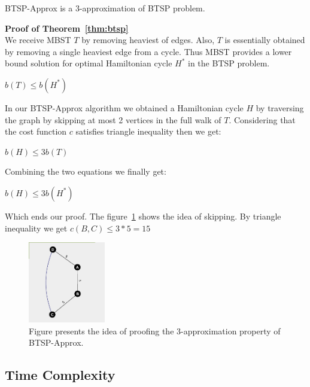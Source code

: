 \documentclass[runningheads, a4paper]{llncs}
\begin{document}
\begin{theorem} \label{thm:btsp}
    BTSP-Approx is a 3-approximation of BTSP problem.
\end{theorem}

\textbf {Proof of Theorem~\ref{thm:btsp}}\\
        
We receive MBST $T$ by removing heaviest of edges. Also, $T$ is essentially obtained by removing a single heaviest edge from a cycle. Thus MBST provides a lower bound solution for optimal Hamiltonian cycle $H^*$ in the BTSP problem.
\begin{center}
    $b(T) \leq b(H^*)$
\end{center}

In our BTSP-Approx algorithm we obtained a Hamiltonian cycle $H$ by traversing the graph by skipping at most 2 vertices in the full walk of $T$. Considering that the cost function $c$ satisfies triangle inequality then we get:

\begin{center}
    $b(H) \leq 3b(T)$
\end{center}

Combining the two equations we finally get:

\begin{center}
    $b(H) \leq 3b(H^*)$
\end{center}
Which  ends our proof.
The figure~\ref{fig:3approx_proof} shows the idea of skipping. By triangle inequality we get $c(B,C) \leq 3 * 5 = 15$
\begin{figure}[H]
    \includegraphics[width=0.30\textwidth]{res/3approx_proof.png}
    \caption{Figure presents the idea of proofing the 3-approximation property of BTSP-Approx.}
    \label{fig:3approx_proof}
\end{figure}

\subsection{Time Complexity}
\end{document}
